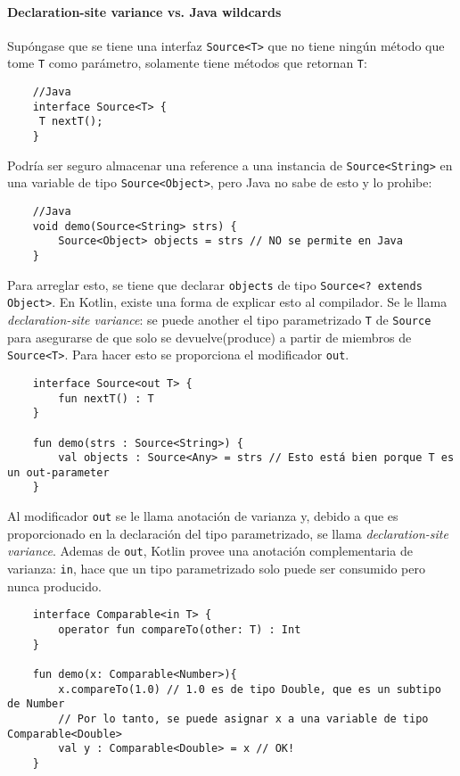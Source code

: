 \paragraph{Declaration-site variance vs. Java wildcards} 
Supóngase que se tiene una interfaz \texttt{Source<T>} que no tiene ningún método que tome \texttt{T} como parámetro, solamente tiene métodos que retornan \texttt{T}:
\begin{verbatim}
    //Java
    interface Source<T> {
     T nextT();
    }
\end{verbatim}
Podría ser seguro almacenar una reference a una instancia de \texttt{Source<String>} en una variable de tipo \texttt{Source<Object>}, pero Java no sabe de esto y lo prohibe:
\begin{verbatim}
    //Java
    void demo(Source<String> strs) {
        Source<Object> objects = strs // NO se permite en Java
    }
\end{verbatim}
Para arreglar esto, se tiene que declarar \texttt{objects} de tipo \texttt{Source<? extends Object>}. En Kotlin, existe una forma de explicar esto al compilador. Se le llama \emph{declaration-site variance}: se puede another el tipo parametrizado \texttt{T} de \texttt{Source} para asegurarse de que solo se devuelve(produce) a partir de miembros de \texttt{Source<T>}. Para hacer esto se proporciona el modificador \texttt{out}.
\begin{verbatim}
    interface Source<out T> {
        fun nextT() : T
    }
    
    fun demo(strs : Source<String>) {
        val objects : Source<Any> = strs // Esto está bien porque T es un out-parameter
    } 
\end{verbatim}
 
Al modificador \texttt{out} se le llama anotación de varianza y, debido a que es proporcionado en la declaración del tipo parametrizado, se llama \emph{declaration-site variance}. 
Ademas de \texttt{out}, Kotlin provee una anotación complementaria de varianza: \texttt{in}, hace que un tipo parametrizado solo puede ser consumido pero nunca producido.
\begin{verbatim}
    interface Comparable<in T> {
        operator fun compareTo(other: T) : Int
    }    
    
    fun demo(x: Comparable<Number>){
        x.compareTo(1.0) // 1.0 es de tipo Double, que es un subtipo de Number
        // Por lo tanto, se puede asignar x a una variable de tipo Comparable<Double>
        val y : Comparable<Double> = x // OK!
    }
\end{verbatim}

